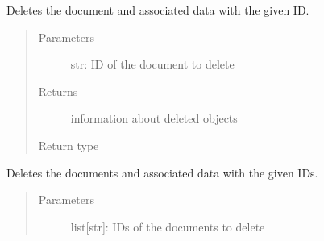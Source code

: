 \documentclass[letterpaper,10pt,english]{sphinxmanual}
\begin{document}
\begin{fulllineitems}
\begin{fulllineitems}
\label{\detokenize{autoapi/pine/client/client/index:pine.client.client.PineClient.delete_document}}
\sphinxAtStartPar
Deletes the document and associated data with the given ID.
\begin{quote}\begin{description}
\item[{Parameters}] \leavevmode
\sphinxAtStartPar
{} \textendash{} str: ID of the document to delete

\item[{Returns}] \leavevmode
\sphinxAtStartPar
information about deleted objects

\item[{Return type}] \leavevmode
\sphinxAtStartPar
{}

\end{description}\end{quote}

\end{fulllineitems}


\begin{fulllineitems}
\label{\detokenize{autoapi/pine/client/client/index:pine.client.client.PineClient.delete_documents}}
\sphinxAtStartPar
Deletes the documents and associated data with the given IDs.
\begin{quote}\begin{description}
\item[{Parameters}] \leavevmode
\sphinxAtStartPar
{} \textendash{} list{[}str{]}: IDs of the documents to delete


\end{description}
\end{quote}
\end{fulllineitems}
\end{fulllineitems}
\end{document}
